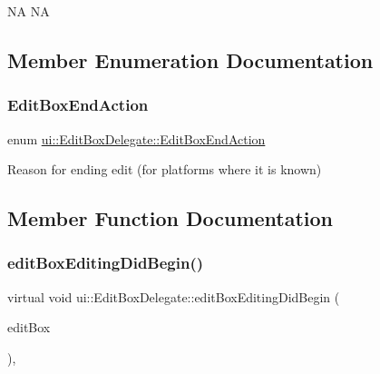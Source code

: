 NA  NA 

\subsection{Member Enumeration Documentation}
\mbox{\label{classui_1_1EditBoxDelegate_ae7285a0cdbe2f2daf0557c97dba0bdb5}} 
\subsubsection{\texorpdfstring{Edit\+Box\+End\+Action}{EditBoxEndAction}}
{\footnotesize\ttfamily enum \hyperlink{classui_1_1EditBoxDelegate_ae7285a0cdbe2f2daf0557c97dba0bdb5}{ui\+::\+Edit\+Box\+Delegate\+::\+Edit\+Box\+End\+Action}\hspace{0.3cm}{\ttfamily [strong]}}

Reason for ending edit (for platforms where it is known) 

\subsection{Member Function Documentation}
\mbox{\label{classui_1_1EditBoxDelegate_aad37c3eef84de98c9bf5611b17a223b5}} 
\subsubsection{\texorpdfstring{edit\+Box\+Editing\+Did\+Begin()}{editBoxEditingDidBegin()}\hspace{0.1cm}{\footnotesize\ttfamily [1/2]}}
{\footnotesize\ttfamily virtual void ui\+::\+Edit\+Box\+Delegate\+::edit\+Box\+Editing\+Did\+Begin (\begin{DoxyParamCaption}\item[{\hyperlink{classui_1_1EditBox}{Edit\+Box} $\ast$}]{edit\+Box }\end{DoxyParamCaption})\hspace{0.3cm}{\ttfamily [inline]}, {\ttfamily [virtual]}}

